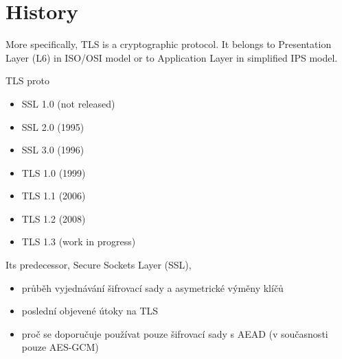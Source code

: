 \section{History}

More specifically, TLS is a cryptographic protocol. It belongs to Presentation Layer (L6) in ISO/OSI model or to Application Layer in simplified IPS model.

TLS proto

\begin{itemize}
  \item SSL 1.0 (not released)
  \item SSL 2.0 (1995)
  \item SSL 3.0 (1996)
  \item TLS 1.0 (1999)
  \item TLS 1.1 (2006)
  \item TLS 1.2 (2008)
  \item TLS 1.3 (work in progress)
\end{itemize}

Its predecessor, Secure Sockets Layer (SSL),


\begin{itemize}
  \item průběh vyjednávání šifrovací sady a asymetrické výměny klíčů
  \item poslední objevené útoky na TLS
  \item proč se doporučuje používat pouze šifrovací sady s AEAD (v současnosti pouze AES-GCM)
\end{itemize}

